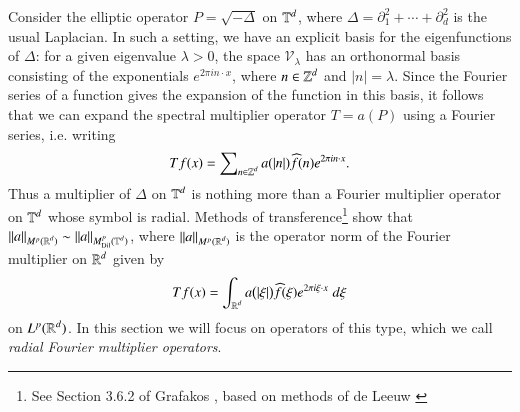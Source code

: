 Consider the elliptic operator $P = \sqrt{-\Delta}$ on $\operatorname{\mathbb{T}}^d$, where $\Delta = \partial_1^2 + \cdots + \partial_d^2$ is the usual Laplacian. In such a setting, we have an explicit basis for the eigenfunctions of $\Delta$: for a given eigenvalue $\lambda > 0$, the space $\mathcal{V}_\lambda$ has an orthonormal basis consisting of the exponentials $e^{2 \pi i n \cdot x}$, where $n \in \operatorname{\mathbb{Z}}^d$ and $|n| = \lambda$. Since the Fourier series of a function gives the expansion of the function in this basis, it follows that we can expand the spectral multiplier operator $T = a(P)$ using a Fourier series, i.e. writing
%
\[ Tf(x) = \sum\nolimits_{n \in \operatorname{\mathbb{Z}}^d} a( |n| ) \widehat{f}(n) e^{2 \pi i n \cdot x}. \]
%
Thus a multiplier of $\Delta$ on $\operatorname{\mathbb{T}}^d$ is nothing more than a Fourier multiplier operator on $\operatorname{\mathbb{T}}^d$ whose symbol is radial. Methods of transference\footnote{See Section 3.6.2 of Grafakos \cite{Grafakos}, based on methods of de Leeuw \cite{deLeeuw}} show that $\| a \|_{M^p(\operatorname{\mathbb{R}}^d)} \sim \| a \|_{M^p_{\text{Dil}}(\operatorname{\mathbb{T}}^d)}$, where $\| a \|_{M^p(\operatorname{\mathbb{R}}^d)}$ is the operator norm of the Fourier multiplier on $\operatorname{\mathbb{R}}^d$ given by
%
\[ Tf(x) = \int_{\operatorname{\mathbb{R}}^d} a \big(|\xi| \big) \widehat{f}(\xi) e^{2 \pi i \xi \cdot x}\; d\xi \]
%
on $L^p(\operatorname{\mathbb{R}}^d)$. In this section we will focus on operators of this type, which we call \emph{radial Fourier multiplier operators}.

